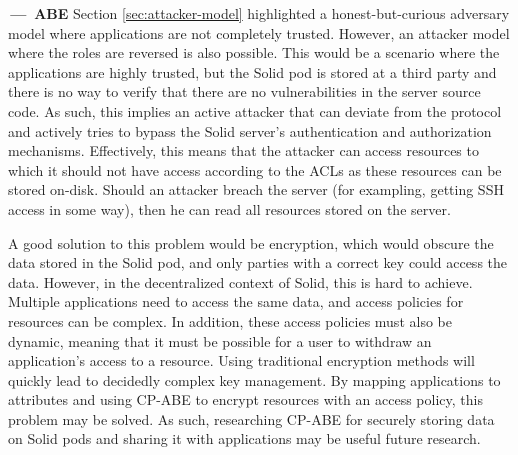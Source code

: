 \begin{futurework}\label{fw:abe}
\textbf{\,---\, \acrlong{ABE}}
Section \ref{sec:attacker-model} highlighted a honest-but-curious adversary model where applications are not completely trusted. However, an attacker model where the roles are reversed is also possible. This would be a scenario where the applications are highly trusted, but the Solid pod is stored at a third party and there is no way to verify that there are no vulnerabilities in the server source code. As such, this implies an active attacker that can deviate from the protocol and actively tries to bypass the Solid server's authentication and authorization mechanisms. Effectively, this means that the attacker can access resources to which it should not have access according to the \gls{ACL}s as these resources can be stored on-disk. Should an attacker breach the server (for exampling, getting SSH access in some way), then he can read all resources stored on the server. 

A good solution to this problem would be encryption, which would obscure the data stored in the Solid pod, and only parties with a correct key could access the data. However, in the decentralized context of Solid, this is hard to achieve. Multiple applications need to access the same data, and access policies for resources can be complex. In addition, these access policies must also be dynamic, meaning that it must be possible for a user to withdraw an application's access to a resource. Using traditional encryption methods will quickly lead to decidedly complex key management. By mapping applications to attributes and using \acrlong{CP-ABE} to encrypt resources with an access policy, this problem may be solved. As such, researching \gls{CP-ABE} for securely storing data on Solid pods and sharing it with applications may be useful future research.



\end{futurework}
